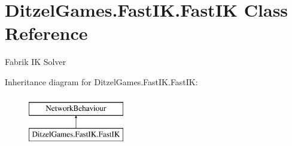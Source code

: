 \hypertarget{class_ditzel_games_1_1_fast_i_k_1_1_fast_i_k}{}\section{Ditzel\+Games.\+Fast\+I\+K.\+Fast\+IK Class Reference}
\label{class_ditzel_games_1_1_fast_i_k_1_1_fast_i_k}


Fabrik IK Solver  


Inheritance diagram for Ditzel\+Games.\+Fast\+I\+K.\+Fast\+IK\+:\begin{figure}[H]
\begin{center}
\leavevmode
\includegraphics[height=2.000000cm]{class_ditzel_games_1_1_fast_i_k_1_1_fast_i_k}
\end{center}
\end{figure}
